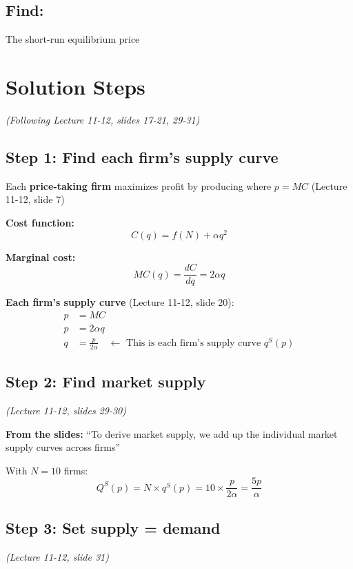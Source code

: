 \documentclass[11pt]{article}
\begin{document}
\subsection*{Find:} The short-run equilibrium price

\newpage

\section{Solution Steps}
\textit{(Following Lecture 11-12, slides 17-21, 29-31)}

\subsection{Step 1: Find each firm's supply curve}

Each \textbf{price-taking firm} maximizes profit by producing where \textbf{$p = MC$} (Lecture 11-12, slide 7)

\vspace{0.3cm}
\textbf{Cost function:}
\[
C(q) = f(N) + \alpha q^2
\]

\textbf{Marginal cost:}
\[
MC(q) = \frac{dC}{dq} = 2\alpha q
\]

\textbf{Each firm's supply curve} (Lecture 11-12, slide 20):
\begin{align*}
p &= MC \\
p &= 2\alpha q \\
q &= \frac{p}{2\alpha} \quad \leftarrow \text{ This is each firm's supply curve } q^S(p)
\end{align*}

\subsection{Step 2: Find market supply}
\textit{(Lecture 11-12, slides 29-30)}

\begin{tcolorbox}[colback=boxgreen, colframe=green!50!black]
\textbf{From the slides:} ``To derive market supply, we add up the individual market supply curves across firms''
\end{tcolorbox}

With $N = 10$ firms:
\[
Q^S(p) = N \times q^S(p) = 10 \times \frac{p}{2\alpha} = \frac{5p}{\alpha}
\]

\subsection{Step 3: Set supply = demand}
\textit{(Lecture 11-12, slide 31)}
\end{document}
